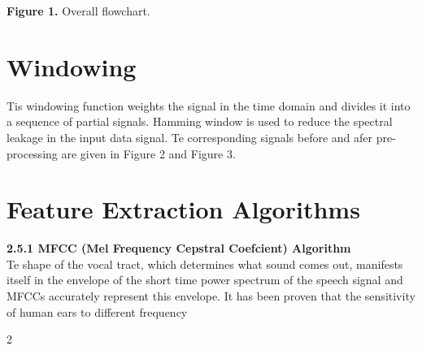 \documentclass[10pt,a4paper,twoside]{article}
\begin{document}
\begin{multicols*}{2}
\begin{tikzpicture}[node distance=3cm]
\end{tikzpicture}

\vspace*{0.25cm}
{\color{tieude} \textbf{Figure 1.}} Overall flowchart.
\vspace{-0.5cm}
\section*{\color{tieude} {\fontsize{11pt}{13pt} Windowing}}
\vspace{-0.25cm}
Tis windowing function weights the signal in the time
domain and divides it into a sequence of partial signals.
Hamming window is used to reduce the spectral leakage
in the input data signal. Te corresponding signals before
and afer pre-processing are given in Figure 2 and Figure 3.
\vspace{-0.7cm}
\section*{\color{tieude} {\fontsize{11pt}{13pt} Feature Extraction Algorithms}}
\vspace{-0.4cm}
{\color{tieude} \textbf{2.5.1 MFCC (Mel Frequency Cepstral
Coefcient) Algorithm}}\\
Te shape of the vocal tract, which determines what sound
comes out, manifests itself in the envelope of the short
time power spectrum of the speech signal and MFCCs
accurately represent this envelope. It has been proven
that the sensitivity of human ears to different frequency
\end{multicols*}{2}
\end{document}
